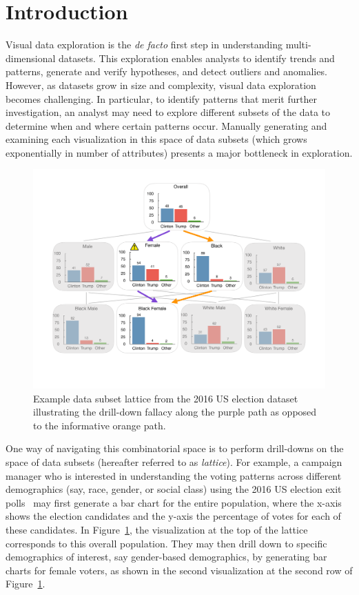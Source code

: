 \section{Introduction}
\par Visual data exploration is the \emph{de facto} first step in understanding multi-dimensional datasets. This exploration enables analysts to identify trends and patterns, generate and verify hypotheses, and detect outliers and anomalies. However, as datasets grow in size and complexity, visual data exploration becomes challenging. In particular, to identify patterns that merit further investigation, an analyst may need to explore different subsets of the data to determine when and where certain patterns occur. Manually generating and examining each visualization in this space of data subsets (which grows exponentially in number of attributes) presents a major bottleneck in exploration.
\begin{figure}[ht!]
\includegraphics[width=\linewidth]{figures/elections_example_lattice_teaser.pdf}
\caption{Example data subset lattice from the 2016 US election dataset illustrating the drill-down fallacy along the purple path as opposed to the informative orange path.}
\label{fig:elections_example}
\end{figure}
\par One way of navigating this combinatorial space is to perform drill-downs on the space of data subsets (hereafter referred to as \emph{lattice}). For example, a campaign manager who is interested in understanding the voting patterns across different demographics (say, race, gender, or social class) using the 2016 US election exit polls~\cite{exitpolls} may first generate a bar chart for the entire population, where the x-axis shows the election candidates and the y-axis the percentage of votes for each of these candidates. In Figure~\ref{fig:elections_example}, the visualization at the top of the lattice corresponds to this overall population. They may then drill down to specific demographics of interest, say gender-based demographics, by generating bar charts for female voters, as shown in the second visualization at the second row of Figure~\ref{fig:elections_example}.
